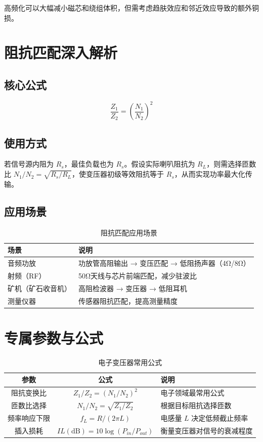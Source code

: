 \documentclass[12pt,UTF8]{ctexbook}
\begin{document}
高频化可以大幅减小磁芯和绕组体积，但需考虑趋肤效应和邻近效应导致的额外铜损。

\section{阻抗匹配深入解析}

\subsection{核心公式}

$$
\frac{Z_{1}}{Z_{2}} = \left(\frac{N_{1}}{N_{2}}\right)^{2}
$$

\subsection{使用方式}

若信号源内阻为 $R_s$，最佳负载也为 $R_s$。假设实际喇叭阻抗为 $R_L$，则需选择匝数比 $N_1/N_2 = \sqrt{R_s / R_L}$，使变压器初级等效阻抗等于 $R_s$，从而实现功率最大化传输。

\subsection{应用场景}

\begin{table}[htbp]
\centering
\caption{阻抗匹配应用场景}
\begin{tabular}{|p{4cm}|p{8cm}|}
\hline
\textbf{场景} & \textbf{说明} \\
\hline
音频功放 & 功放管高阻输出 → 变压匹配 → 低阻扬声器（4Ω/8Ω） \\
\hline
射频（RF） & 50Ω天线与芯片前端匹配，减少驻波比 \\
\hline
矿机（矿石收音机） & 高阻检波器 → 变压器 → 低阻耳机 \\
\hline
测量仪器 & 传感器阻抗匹配，提高测量精度 \\
\hline
\end{tabular}
\end{table}

\section{专属参数与公式}

\begin{table}[htbp]
\centering
\caption{电子变压器常用公式}
\begin{tabular}{|c|c|p{6cm}|}
\hline
\textbf{参数} & \textbf{公式} & \textbf{说明} \\
\hline
阻抗变换比 & $Z_1 / Z_2 = (N_1 / N_2)^2$ & 电子领域最常用公式 \\
\hline
匝数比选择 & $N_1 / N_2 = \sqrt{Z_1 / Z_2}$ & 根据目标阻抗选择匝数 \\
\hline
频率响应下限 & $f_L = R / (2\pi L)$ & 电感量 $L$ 决定低频截止频率 \\
\hline
插入损耗 & $IL(\text{dB}) = 10\log(P_{in} / P_{out})$ & 衡量变压器对信号的衰减程度 \\
\hline
\end{tabular}
\end{table}
\end{document}
